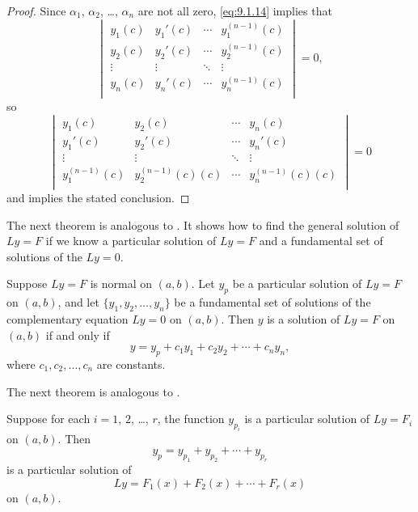 \begin{proof}
Since $\alpha_{1}$, $\alpha_{2}$, \dots, $\alpha_{n}$
are not all zero,
\eqref{eq:9.1.14} implies that
\[
\begin{vmatrix}
y_{1}(c)&y_{1}'(c)&\cdots&y_{1}^{(n-1)}(c)\\
y_{2}(c)&y_{2}'(c)&\cdots&y_{2}^{(n-1)}(c)\\
\vdots&\vdots&\ddots&\vdots\\
y_{n}(c)&y_{n}'(c)&\cdots&y_{n}^{(n-1)}(c)\\
\end{vmatrix}=0,
\]
so
\[
\begin{vmatrix}
y_{1}(c)&y_{2}(c)&\cdots& y_{n}(c)\\
y_{1}'(c)&y_{2}'(c)&\cdots& y_{n}'(c)\\
\vdots&\vdots&\ddots&\vdots\\
y_{1}^{(n-1)}(c)&y_{2}^{(n-1)}(c)(c)&\cdots& y_{n}^{(n-1)}(c)(c)\\
\end{vmatrix}=0
\]
and  implies the stated conclusion.
\end{proof}



The next theorem is analogous to
.
It shows how to find the general solution of $Ly=F$ if we know a particular
solution
of $Ly=F$ and a fundamental set of solutions of the
 $Ly=0$.

\begin{theorem}\label{thmtype:9.1.6}
Suppose $Ly=F$ is normal on $(a,b)$. Let $y_p$ be a particular
solution of $Ly=F$ on $(a,b)$, and let $\{y_1,y_2,\dots,y_n\}$ be a
fundamental set of solutions of the complementary equation $Ly=0$ on
$(a,b)$. Then $y$ is a solution of $Ly=F$ on $(a,b)$ if and only if
\[
y=y_p+c_1y_1+c_2y_2+\cdots+c_ny_n,
\]
where $c_1,c_2,\dots,c_n$  are constants.
\end{theorem}

The next theorem is analogous to .

\begin{theorem}\label{thmtype:9.1.7}
Suppose for each $i=1$, $2$, \dots, $r$, the function $y_{p_i}$ is a
particular solution of $Ly=F_i$ on  $(a,b)$. Then
\[
y_p=y_{p_1}+y_{p_2}+\cdots+y_{p_r}
\]
is a particular  solution of
\[
Ly=F_1(x)+F_2(x)+\cdots+F_r(x)
\]
on $(a,b)$.
\end{theorem}

